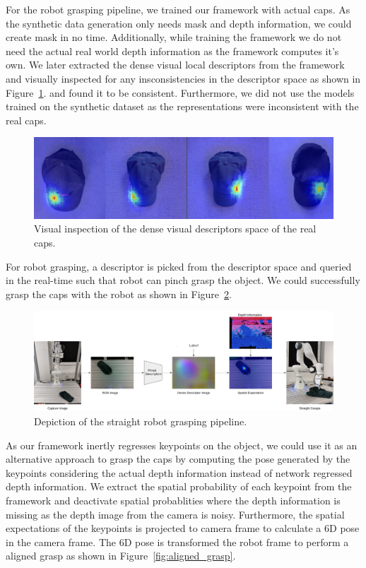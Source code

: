For the robot grasping pipeline, we trained our framework with actual caps. As the synthetic data generation only needs mask and depth information, we could
create mask in no time. Additionally, while training the framework we do not need the actual real world depth information as the framework computes it's own.
We later extracted the dense visual local descriptors from the framework and visually inspected for any insconsistencies in the descriptor space as shown in Figure~\ref{fig:check_real_caps}.
and found it to be consistent. Furthermore, we did not use the models trained on the synthetic dataset as the representations were inconsistent with the real caps.

\begin{figure}[htb]
    \centering
    \includegraphics[scale=0.15]{images/test_real_caps.png}
    \caption{Visual inspection of the dense visual descriptors space of the real caps.}
    \label{fig:check_real_caps}
\end{figure}

For robot grasping, a descriptor is picked from the descriptor space and queried in the real-time such that robot can pinch grasp the object.
We could successfully grasp the caps with the robot as shown in Figure~\ref{fig:straight_grasp}.

\begin{figure}[htb]
    \centering
    \includegraphics[scale=0.15]{images/straight_grasps.png}
    \caption{Depiction of the straight robot grasping pipeline.}
    \label{fig:straight_grasp}
\end{figure}

As our framework inertly regresses keypoints on the object, we could use it as an alternative approach to grasp the caps by computing the pose
generated by the keypoints considering the actual depth information instead of network regressed depth information. We extract the spatial probability of each keypoint
from the framework and deactivate spatial probablities where the depth information is missing as the depth image from the camera is noisy.
Furthermore, the spatial expectations of the keypoints is projected to camera frame to calculate a 6D pose in the camera frame.
The 6D pose is transformed the robot frame to perform a aligned grasp as shown in Figure~\ref{fig:aligned_grasp}.

